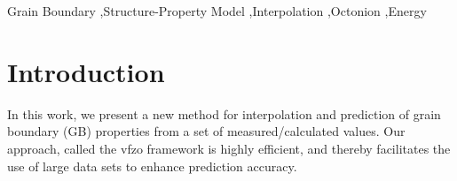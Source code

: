 \documentclass[final,twocolumn,12pt]{elsarticle}
\begin{document}
\begin{frontmatter}
\glsresetall %

\begin{keyword}
Grain Boundary \sep Structure-Property Model \sep Interpolation \sep Octonion \sep Energy
\end{keyword}


\end{frontmatter}

\section{Introduction} \label{sec:intro}

In this work, we present a new method for interpolation and prediction of grain boundary (GB) properties from a set of measured/calculated values. Our approach, called the \gls{vfzo} framework is highly efficient, and thereby facilitates the use of large data sets to enhance prediction accuracy.
\end{document}
